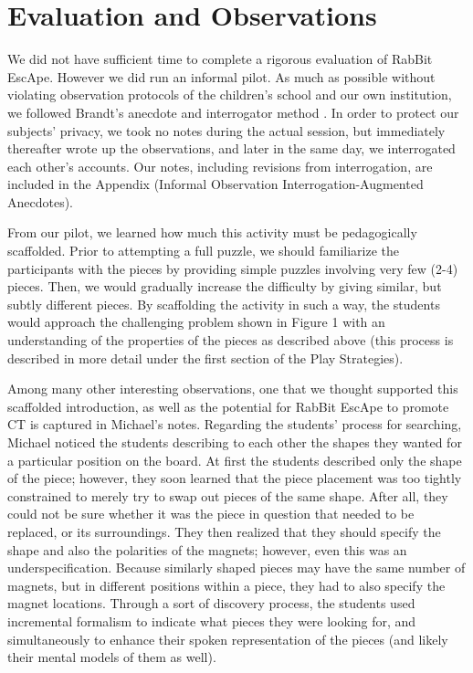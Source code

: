 \documentclass{acm_proc_article-sp}
\begin{document}
\section{Evaluation and Observations}
We did not have sufficient time to complete a rigorous evaluation of RabBit EscApe. However we did run an informal pilot. As much as possible without violating observation protocols of the children’s school and our own institution, we followed Brandt’s anecdote and interrogator method \cite{brandt1972studying}. In order to protect our subjects’ privacy, we took no notes during the actual session, but immediately thereafter wrote up the observations, and later in the same day, we interrogated each other’s accounts. Our notes, including revisions from interrogation, are included in the Appendix (Informal Observation Interrogation-Augmented Anecdotes).

From our pilot, we learned how much this activity must be pedagogically scaffolded. Prior to attempting a full puzzle, we should familiarize the participants with the pieces by providing simple puzzles involving very few (2-4) pieces. Then, we would gradually increase the difficulty by giving similar, but subtly different pieces. By scaffolding the activity in such a way, the students would approach the challenging problem shown in Figure 1 with an understanding of the properties of the pieces as described above (this process is described in more detail under the first section of the Play Strategies).

Among many other interesting observations, one that we thought supported this scaffolded introduction, as well as the potential for RabBit EscApe to promote CT is captured in Michael’s notes. Regarding the students’ process for searching, Michael noticed the students describing to each other the shapes they wanted for a particular position on the board. At first the students described only the shape of the piece; however, they soon learned that the piece placement was too tightly constrained to merely try to swap out pieces of the same shape. After all, they could not be sure whether it was the piece in question that needed to be replaced, or its surroundings. They then realized that they should specify the shape and also the polarities of the magnets; however, even this was an underspecification. Because similarly shaped pieces may have the same number of magnets, but in different positions within a piece, they had to also specify the magnet locations. Through a sort of discovery process, the students used incremental formalism\cite{shipman1999formality} to indicate what pieces they were looking for, and simultaneously to enhance their spoken representation of the pieces (and likely their mental models of them as well).
\end{document}
